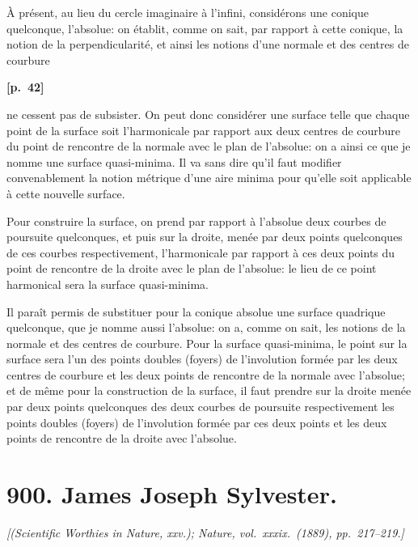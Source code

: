 \documentclass[11pt,a4paper]{article}
\theoremstyle{plain}
\begin{document}
\`A pr\'esent, au lieu du cercle imaginaire \`a l'infini, consid\'erons une conique quelconque, l'absolue: on \'etablit, comme on sait, par rapport \`a cette conique, la notion de la perpendicularit\'e, et ainsi les notions d'une normale et des centres de courbure

\vspace{0.5em}
\noindent\textbf{[p.\ 42]}

ne cessent pas de subsister. On peut donc consid\'erer une surface telle que chaque point de la surface soit l'harmonicale par rapport aux deux centres de courbure du point de rencontre de la normale avec le plan de l'absolue: on a ainsi ce que je nomme une surface quasi-minima. Il va sans dire qu'il faut modifier convenablement la notion m\'etrique d'une aire minima pour qu'elle soit applicable \`a cette nouvelle surface.

Pour construire la surface, on prend par rapport \`a l'absolue deux courbes de poursuite quelconques, et puis sur la droite, men\'ee par deux points quelconques de ces courbes respectivement, l'harmonicale par rapport \`a ces deux points du point de rencontre de la droite avec le plan de l'absolue: le lieu de ce point harmonical sera la surface quasi-minima.

Il para\^it permis de substituer pour la conique absolue une surface quadrique quelconque, que je nomme aussi l'absolue: on a, comme on sait, les notions de la normale et des centres de courbure. Pour la surface quasi-minima, le point sur la surface sera l'un des points doubles (foyers) de l'involution form\'ee par les deux centres de courbure et les deux points de rencontre de la normale avec l'absolue; et de m\^eme pour la construction de la surface, il faut prendre sur la droite men\'ee par deux points quelconques des deux courbes de poursuite respectivement les points doubles (foyers) de l'involution form\'ee par ces deux points et les deux points de rencontre de la droite avec l'absolue.

\newpage

\section*{900. James Joseph Sylvester.}

\noindent\textit{[(Scientific Worthies in Nature, xxv.); Nature, vol.\ xxxix.\ (1889), pp.\ 217--219.]}
\end{document}
